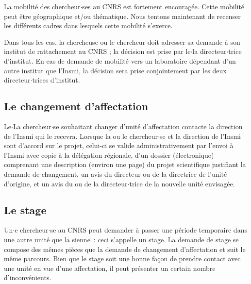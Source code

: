 
La mobilit\'e des chercheur$\cdot$ses au CNRS est fortement encourag\'ee.
Cette mobilit\'e peut \^etre g\'eo\-gra\-phi\-que et/ou
th\'ematique. Nous tentons maintenant de recenser les
diff\'erents cadres dans lesquels cette mobilit\'e s'exerce.

Dans tous les cas, la chercheuse ou le chercheur doit adresser sa demande \`a son institut de rattachement au CNRS ; la d\'ecision est prise par le$\cdot$la directeur$\cdot$trice d'institut. En  cas de demande de mobilit\'e vers un laboratoire d\'ependant d'un autre institut que l'Insmi, la d\'ecision sera prise conjointement par les deux directeur$\cdot$trices d'institut. 

\subsection{Le changement d'affectation}

Le$\cdot$La chercheur$\cdot$se  souhaitant changer d'unit\'e d'affectation contacte la direction de l'Insmi qui le recevra. Lorsque la ou le chercheur$\cdot$se et la direction de l'Insmi sont d'accord sur le projet, celui-ci se valide administrativement par l'envoi \`a l'Insmi 
avec copie \`a la d\'el\'egation r\'egionale, d'un dossier (\'electronique)
comprenant une description (environ une page) du projet scientifique
justifiant la demande de changement, un avis du directeur ou de la directrice
de l'unit\'e d'origine, et un avis du ou de la directeur$\cdot$trice de la nouvelle
unit\'e envisag\'ee.


\subsection{Le stage}

Un$\cdot$e chercheur$\cdot$se au CNRS peut demander \`a passer une p\'eriode
temporaire dans une autre unit\'e que la sienne~: ceci s'appelle
un stage. La demande de stage se compose des m\^emes pi\`eces
que la demande de changement d'affectation et suit le m\^eme
parcours. Bien que le stage soit une bonne fa\c con de prendre
contact avec une unit\'e en vue d'une affectation, il peut pr\'esenter
un certain nombre d'inconv\'enients.

